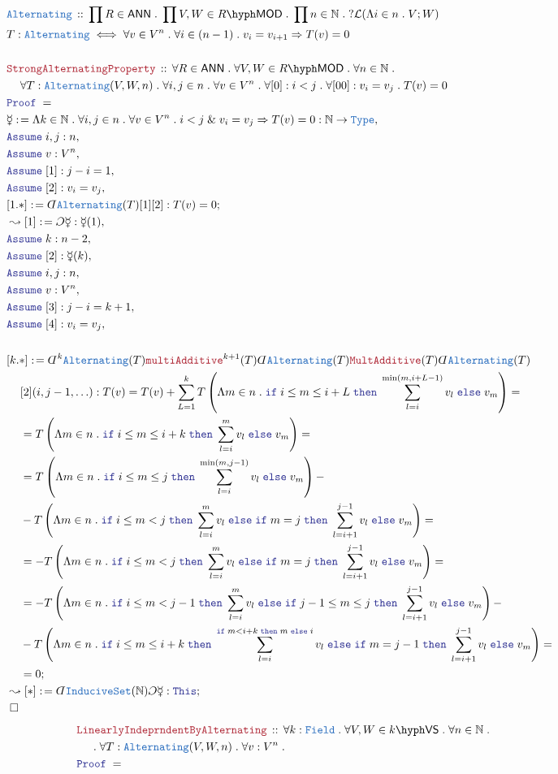 \documentclass[12pt]{scrartcl}%
\newcommand{\TYPE}[1]{\textcolor{NavyBlue}{\mathtt{#1}}}%
\newcommand{\LOGIC}[1]{\textcolor{Blue}{\mathtt{#1}}}%
\newcommand{\THM}[1]{\textcolor{Maroon}{\mathtt{#1}}}%
\renewcommand{\.}{\; . \;} %
\newcommand{\de}{: \kern 0.1pc =} %
\newcommand{\If}{\LOGIC{if} \;} %
\newcommand{\Then}{ \; \LOGIC{then} \;} %
\newcommand{\Else}{\; \LOGIC{else} \;} %
\newcommand{\Theorem}[2]{& \THM{#1} \, :: \, #2 \\ & \Proof = \\ } %
\newcommand{\DeclareType}[2]{& \TYPE{#1} \, :: \, #2 \\}%
\newcommand{\DefineType}[3]{& #1 : \TYPE{#2} \iff #3 \\}%
\newcommand{\NewLine}{\\ & \kern 1pc}%
\newcommand{\Page}[1]{ \begin{align*} #1 \end{align*}  }%
\newcommand{ \bd }{ \ByDef }%
\renewcommand{\And}{\; \& \;}%
\newcommand{\Type}{\TYPE{Type}}%
\newcommand{\Nat}{\mathbb{N}}%
\newcommand{\Say}[3]{& #1 \de #2 : #3, \\} %
\newcommand{\Conclude}[3]{& #1 \de #2 : #3; \\}%
\newcommand{\Derive}[3]{& \leadsto #1 \de #2 : #3, \\} %
\newcommand{\DeriveConclude}[3]{& \leadsto #1 \de #2 : #3 ; \\} %
\newcommand{\Assume}[2]{& \LOGIC{Assume} \; #1 : #2, \\} %
\newcommand{\QED}{\; \square} %
\newcommand{\EndProof}{& \QED \\} %
\newcommand{\ByDef}{\rotatebox[origin=c]{-180}{$D$}}%
\newcommand{\ByConstr}{\rotatebox[origin=c]{-180}{$C$}}%
\newcommand{\Proof}{\LOGIC{Proof} \; } %
\newcommand{\VS}[1]{#1\hyph\mathsf{VS}} %
\newcommand{\LMOD}[1]{#1\hyph\mathsf{MOD}} %
\renewcommand{\L}{\mathcal{L}}
\newcommand{\Field}{\TYPE{Field}}
\newcommand{\ANN}{\mathsf{ANN}} %
\begin{document}
\Page{
        \\
	\DeclareType{Alternating}{\prod R \in \ANN \. \prod V,W \in \LMOD{R} \. \prod n \in \Nat \. ?\L( \Lambda i \in n \. V; W  )}
	\DefineType{T}{Alternating}{ \forall v \in V^n \. \forall i \in (n-1) \. v_i = v_{i+1} \Rightarrow  T(v) = 0}
	\\
	\Theorem{StrongAlternatingProperty}{\forall R \in \ANN \. \forall V,W \in \LMOD{R} \. \forall n \in \Nat \. \NewLine 
		\forall T : \TYPE{Alternating}(V,W,n) \. \forall i,j \in n \. \forall v \in V^n \. \forall [0] : i < j \.
		\forall [00] : v_i = v_j \. T(v) = 0
	}
	\Say{\mercury}{\Lambda k \in \Nat \. \forall i,j \in n \. \forall v \in V^n \. i < j \And v_i = v_j \Rightarrow T(v) = 0}{\Nat \to \Type}
	\Assume{i,j}{n}
	\Assume{v}{V^n}
	\Assume{[1]}{j - i = 1}
	\Assume{[2]}{v_i = v_j}
	\Conclude{[1.*]}{\bd \TYPE{Alternating}(T)[1][2]}{T(v) = 0}
	\Derive{[1]}{\ByConstr \mercury}{\mercury(1)}
	\Assume{k}{n-2}
	\Assume{[2]}{\mercury(k)}
	\Assume{i,j}{n}
	\Assume{v}{V^n}
	\Assume{[3]}{j-i = k+1}
	\Assume{[4]}{v_i = v_j}
	\\
	\Conclude{[k.*]}{\bd^k \TYPE{Alternating}(T) \THM{multiAdditive}^{k+1}(T)\bd \TYPE{Alternating}(T) \THM{MultAdditive}(T) 
		\bd \TYPE{Alternating}(T) \NewLine [2](i,j-1,\ldots)}
	{
		T(v) = 
		T(v) + \sum^k_{L=1} T\left( \Lambda m \in n \. \If i \le m \le i + L  \Then \sum_{l=i}^{\min(m,i+L-1)} v_l \Else v_m  \right) = \NewLine =  
		T\left( \Lambda m \in n \. \If i \le m \le i + k \Then \sum_{l=i}^m v_l \Else v_m \right) = \NewLine =
		T\left( \Lambda m \in n \. \If i \le m \le j \Then \sum_{l=i}^{\min(m,j-1)} v_l \Else v_m \right) - \NewLine
		-T\left( \Lambda m \in n \. \If i \le m < j \Then \sum_{l=i}^m v_l \Else \If m = j \Then \sum_{l=i+1}^{j-1} v_l \Else v_m \right) =
		\NewLine =
		-T\left( \Lambda m \in n \. \If i \le m < j \Then \sum_{l=i}^m v_l \Else \If m = j \Then \sum_{l=i+1}^{j-1} v_l \Else v_m \right) =
		\NewLine =
		-T\left( \Lambda m \in n \. \If i \le m < j-1 \Then \sum_{l=i}^m v_l \Else \If j-1 \le m \le j \Then \sum_{l=i+1}^{j-1} v_l \Else v_m \right) -
		\NewLine -
		T\left( \Lambda m \in n \. \If i \le m \le i+k \Then \sum_{l=i}^{\If m < i+k \Then m \Else i}
		v_l \Else \If m = j-1 \Then  \sum_{l=i+1}^{j-1} v_l \Else v_m \right) =  \NewLine = 0 
	}
	\DeriveConclude{[*]}{\bd \TYPE{InduciveSet}(\Nat)\ByConstr \mercury}{\LOGIC{This}}
	\EndProof
}\Page{
	\Theorem{LinearlyIndeprndentByAlternating}{
			\forall k : \Field \. 
			\forall V,W \in \VS{k} \.
			\forall n \in \Nat \. \NewLine \. 
			\forall T : \TYPE{Alternating}(V,W,n) \.
			\forall v  : V^n \.
}}
\end{document}
